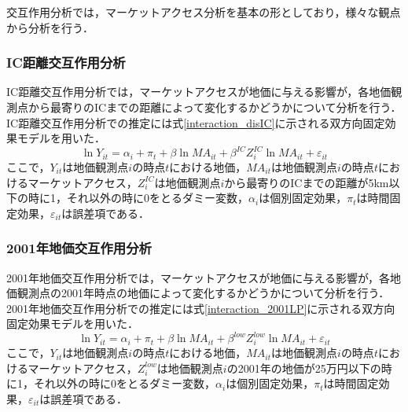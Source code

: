 交互作用分析では，マーケットアクセス分析を基本の形としており，様々な観点から分析を行う．
\subsubsection{IC距離交互作用分析}
IC距離交互作用分析では，マーケットアクセスが地価に与える影響が，各地価観測点から最寄りのICまでの距離によって変化するかどうかについて分析を行う．IC距離交互作用分析での推定には式\ref{interaction_disIC}に示される双方向固定効果モデルを用いた．
\begin{equation}
  \ln{Y_{it}} = \alpha_{i} + \pi_{t} + \beta\ln{MA_{it}} + \beta^{IC}Z^{IC}_{i}\ln{MA_{it}} + \varepsilon_{it}
  \label{interaction_disIC}
\end{equation}
ここで，$Y_{it}$は地価観測点$i$の時点$t$における地価，$MA_{it}$は地価観測点$i$の時点$t$におけるマーケットアクセス，$Z^{IC}_{i}$は地価観測点$i$から最寄りのICまでの距離が5km以下の時に1，それ以外の時に0をとるダミー変数，$\alpha_{i}$は個別固定効果，$\pi_{t}$は時間固定効果，$\varepsilon_{it}$は誤差項である．


\subsubsection{2001年地価交互作用分析}
2001年地価交互作用分析では，マーケットアクセスが地価に与える影響が，各地価観測点の2001年時点の地価によって変化するかどうかについて分析を行う．2001年地価交互作用分析での推定には式\ref{interaction_2001LP}に示される双方向固定効果モデルを用いた．
\begin{equation}
  \ln{Y_{it}} = \alpha_{i} + \pi_{t} + \beta\ln{MA_{it}} + \beta^{low}Z^{low}_{i}\ln{MA_{it}} + \varepsilon_{it}
  \label{interaction_2001LP}
\end{equation}
ここで，$Y_{it}$は地価観測点$i$の時点$t$における地価，$MA_{it}$は地価観測点$i$の時点$t$におけるマーケットアクセス，$Z^{low}_{i}$は地価観測点$i$の2001年の地価が25万円以下の時に1，それ以外の時に0をとるダミー変数，$\alpha_{i}$は個別固定効果，$\pi_{t}$は時間固定効果，$\varepsilon_{it}$は誤差項である．


